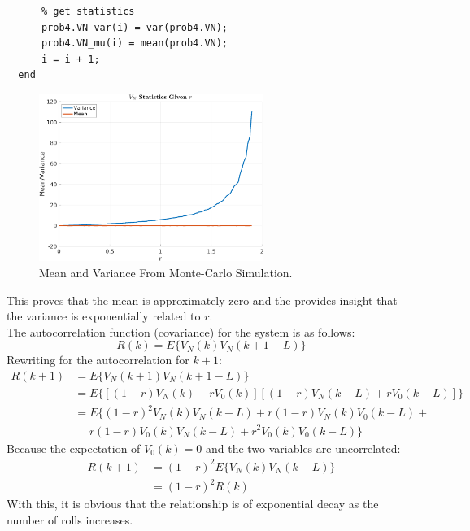 \documentclass[11pt]{article}
\begin{document}
\begin{enumerate}[label=\textbf{\arabic*.}]
\begin{lstlisting}
      % get statistics
      prob4.VN_var(i) = var(prob4.VN);
      prob4.VN_mu(i) = mean(prob4.VN);
      i = i + 1;
  end
  \end{lstlisting}
  \begin{figure}[H]
    \centering
    \includegraphics[width=0.65\textwidth]{p4.png}
    \caption{Mean and Variance From Monte-Carlo Simulation.}
  \end{figure}
  This proves that the mean is approximately zero and the provides insight 
  that the variance is exponentially related to $r$. \\
  The autocorrelation function (covariance) for the system is as follows:
  \begin{equation*}
    R(k) = E\{V_N(k)V_N(k+1-L)\}
  \end{equation*}
  Rewriting for the autocorrelation for $k+1$:
  \begin{equation*}
    \begin{split}
      R(k+1) &= E\{V_N(k+1)V_N(k+1-L)\} \\
      &= E\{[(1-r)V_N(k)+rV_0(k)][(1-r)V_N(k-L)+rV_0(k-L)]\} \\
      &= E\{(1-r)^2V_N(k)V_N(k-L) + r(1-r)V_N(k)V_0(k-L) + \\
      &\:\:\:\:\:\:r(1-r)V_0(k)V_N(k-L) + r^2V_0(k)V_0(k-L)\}
    \end{split}
  \end{equation*}
  Because the expectation of $V_0(k) = 0$ and the two variables are uncorrelated:
  \begin{equation*}
    \begin{split}
      R(k+1) &= (1-r)^2E\{V_N(k)V_N(k-L)\} \\
      &= (1-r)^2R(k)
    \end{split}
  \end{equation*}
  With this, it is obvious that the relationship is of exponential decay as 
  the number of rolls increases.

\end{enumerate}
\end{document}
